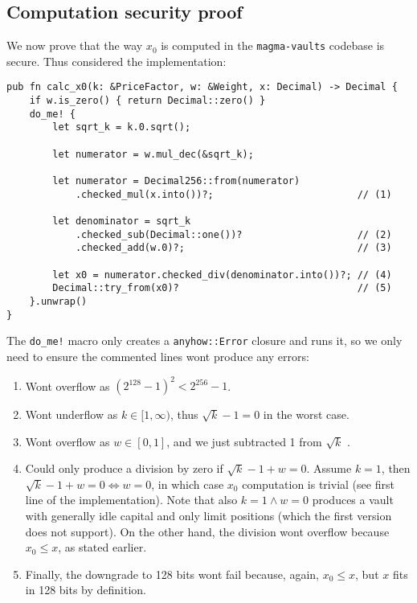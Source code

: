 \documentclass[11pt]{article}
\begin{document}
\subsection{Computation security proof}
We now prove that the way $x_0$ is computed in the \texttt{magma-vaults} codebase
is secure. Thus considered the implementation:
\begin{verbatim}
pub fn calc_x0(k: &PriceFactor, w: &Weight, x: Decimal) -> Decimal {
    if w.is_zero() { return Decimal::zero() }
    do_me! {
        let sqrt_k = k.0.sqrt();

        let numerator = w.mul_dec(&sqrt_k);

        let numerator = Decimal256::from(numerator)
            .checked_mul(x.into())?;                         // (1)

        let denominator = sqrt_k
            .checked_sub(Decimal::one())?                    // (2)
            .checked_add(w.0)?;                              // (3)

        let x0 = numerator.checked_div(denominator.into())?; // (4)
        Decimal::try_from(x0)?                               // (5)
    }.unwrap()
}
\end{verbatim}
The \texttt{do\_me!} macro only creates a \texttt{anyhow::Error} closure
and runs it, so we only need to ensure the commented lines wont produce
any errors:
\begin{enumerate}[label=(\arabic*).]
    \item Wont overflow as $(2^{128} - 1)^2 < 2^{256} - 1$.
    \item Wont underflow as $k\in[1, \infty)$, thus $\sqrt k - 1 = 0$ in the
        worst case.
    \item Wont overflow as $w\in[0, 1]$, and we just subtracted 1 from $\sqrt
        k$ .
    \item Could only produce a division by zero if $\sqrt k -  1 + w = 0$.
        Assume $k= 1$, then $\sqrt k - 1 + w = 0 \iff w = 0$, in which case
        $x_0$ computation is trivial (see first line of the implementation).
        Note that also $k = 1 \land w = 0$ produces a vault with generally idle
        capital and only limit positions (which the first version does not
        support). On the other hand, the division wont overflow because $x_0
        \leq x$, as stated earlier.
    \item Finally, the downgrade to 128 bits wont fail because, again, $x_0
        \leq x$, but $x$ fits in 128 bits by definition.
\end{enumerate}
\end{document}
